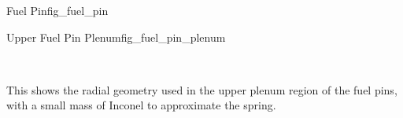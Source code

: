 \begin{geoitem}{Fuel Pin}{fig_fuel_pin}\centering
  
\end{geoitem}
\begin{geoitem}{Upper Fuel Pin Plenum}{fig_fuel_pin_plenum}\centering

\\ \raggedright This shows the radial geometry used in the upper
plenum region of the fuel pins, with a small mass of Inconel to approximate the
spring.
\end{geoitem}
